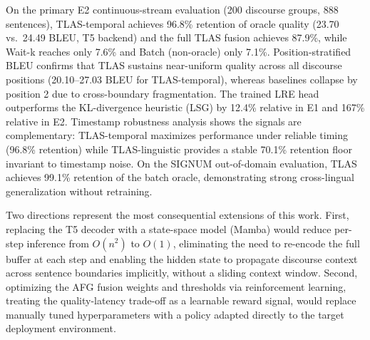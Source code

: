 \documentclass[conference]{IEEEtran}
\begin{document}
On the primary E2 continuous-stream evaluation (200 discourse groups, 888 sentences), TLAS-temporal achieves 96.8\% retention of oracle quality (23.70 vs.\ 24.49 BLEU, T5 backend) and the full TLAS fusion achieves 87.9\%, while Wait-k reaches only 7.6\% and Batch (non-oracle) only 7.1\%. Position-stratified BLEU confirms that TLAS sustains near-uniform quality across all discourse positions (20.10--27.03 BLEU for TLAS-temporal), whereas baselines collapse by position 2 due to cross-boundary fragmentation. The trained LRE head outperforms the KL-divergence heuristic (LSG) by 12.4\% relative in E1 and 167\% relative in E2. Timestamp robustness analysis shows the signals are complementary: TLAS-temporal maximizes performance under reliable timing (96.8\% retention) while TLAS-linguistic provides a stable 70.1\% retention floor invariant to timestamp noise. On the SIGNUM out-of-domain evaluation, TLAS achieves 99.1\% retention of the batch oracle, demonstrating strong cross-lingual generalization without retraining.

Two directions represent the most consequential extensions of this work. First, replacing the T5 decoder with a state-space model (Mamba) would reduce per-step inference from $O(n^2)$ to $O(1)$, eliminating the need to re-encode the full buffer at each step and enabling the hidden state to propagate discourse context across sentence boundaries implicitly, without a sliding context window. Second, optimizing the AFG fusion weights and thresholds via reinforcement learning, treating the quality-latency trade-off as a learnable reward signal, would replace manually tuned hyperparameters with a policy adapted directly to the target deployment environment.



\end{document}
